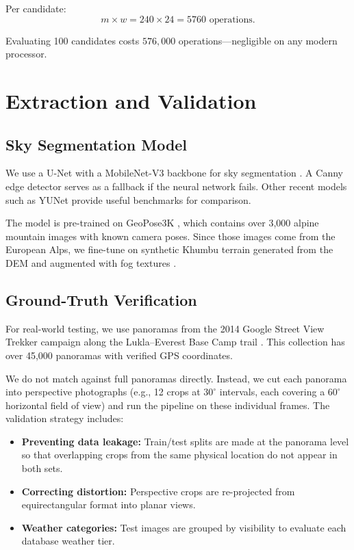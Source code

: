 Per candidate:
\[
m \times w = 240 \times 24 = 5760 \text{ operations.}
\]

Evaluating 100 candidates costs $576{,}000$ operations---negligible on any modern processor.

\section{Extraction and Validation}

\subsection{Sky Segmentation Model}
We use a U-Net with a MobileNet-V3 backbone for sky segmentation \cite{long2015fully, howard2019mobilenetv3}. A Canny edge detector \cite{Canny1986} serves as a fallback if the neural network fails. Other recent models such as YUNet \cite{Yang2025} provide useful benchmarks for comparison.

The model is pre-trained on GeoPose3K \cite{Brejcha2017}, which contains over 3,000 alpine mountain images with known camera poses. Since those images come from the European Alps, we fine-tune on synthetic Khumbu terrain generated from the DEM and augmented with fog textures \cite{tomesek2022cross}.

\subsection{Ground-Truth Verification}
For real-world testing, we use panoramas from the 2014 Google Street View Trekker campaign along the Lukla--Everest Base Camp trail \cite{google2015streetview}. This collection has over 45,000 panoramas with verified GPS coordinates.

We do not match against full panoramas directly. Instead, we cut each panorama into perspective photographs (e.g., 12 crops at $30^{\circ}$ intervals, each covering a $60^{\circ}$ horizontal field of view) and run the pipeline on these individual frames. The validation strategy includes:
\begin{itemize}
    \item \textbf{Preventing data leakage:} Train/test splits are made at the panorama level so that overlapping crops from the same physical location do not appear in both sets.
    \item \textbf{Correcting distortion:} Perspective crops are re-projected from equirectangular format into planar views.
    \item \textbf{Weather categories:} Test images are grouped by visibility to evaluate each database weather tier.
\end{itemize}

